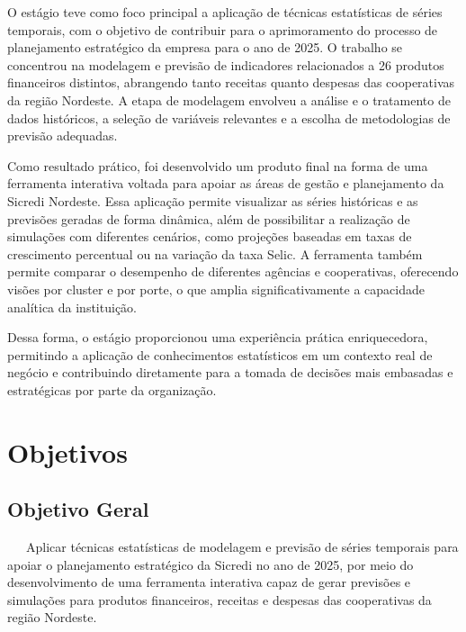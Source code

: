 \documentclass[
  12pt,
  a4paper,
]{scrreprt}
\begin{document}
\vspace{12pt}

O estágio teve como foco principal a aplicação de técnicas estatísticas
de séries temporais, com o objetivo de contribuir para o aprimoramento
do processo de planejamento estratégico da empresa para o ano de 2025. O
trabalho se concentrou na modelagem e previsão de indicadores
relacionados a 26 produtos financeiros distintos, abrangendo tanto
receitas quanto despesas das cooperativas da região Nordeste. A etapa de
modelagem envolveu a análise e o tratamento de dados históricos, a
seleção de variáveis relevantes e a escolha de metodologias de previsão
adequadas.

\vspace{12pt}

Como resultado prático, foi desenvolvido um produto final na forma de
uma ferramenta interativa voltada para apoiar as áreas de gestão e
planejamento da Sicredi Nordeste. Essa aplicação permite visualizar as
séries históricas e as previsões geradas de forma dinâmica, além de
possibilitar a realização de simulações com diferentes cenários, como
projeções baseadas em taxas de crescimento percentual ou na variação da
taxa Selic. A ferramenta também permite comparar o desempenho de
diferentes agências e cooperativas, oferecendo visões por cluster e por
porte, o que amplia significativamente a capacidade analítica da
instituição.

\vspace{12pt}

Dessa forma, o estágio proporcionou uma experiência prática
enriquecedora, permitindo a aplicação de conhecimentos estatísticos em
um contexto real de negócio e contribuindo diretamente para a tomada de
decisões mais embasadas e estratégicas por parte da organização.

\section{Objetivos}\label{objetivos}

\subsection{Objetivo Geral}\label{objetivo-geral}

~~~Aplicar técnicas estatísticas de modelagem e previsão de séries
temporais para apoiar o planejamento estratégico da Sicredi no ano de
2025, por meio do desenvolvimento de uma ferramenta interativa capaz de
gerar previsões e simulações para produtos financeiros, receitas e
despesas das cooperativas da região Nordeste.
\end{document}
